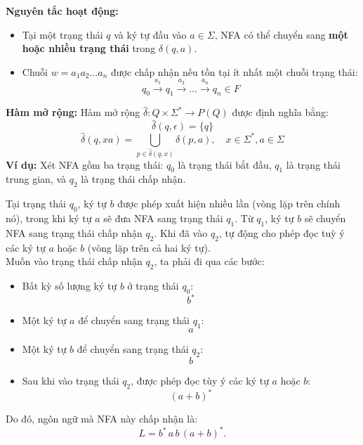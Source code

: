 \documentclass[12pt,a4paper]{report}
\begin{document}
\textbf{Nguyên tắc hoạt động:}  
\begin{itemize}
    \item Tại một trạng thái $q$ và ký tự đầu vào $a \in \Sigma$, NFA có thể chuyển sang \textbf{một hoặc nhiều trạng thái} trong $\delta(q,a)$.
    \item Chuỗi $w = a_1 a_2 \dots a_n$ được chấp nhận nếu tồn tại ít nhất một chuỗi trạng thái:
    \[
        q_0 \xrightarrow{a_1} q_1 \xrightarrow{a_2} \dots \xrightarrow{a_n} q_n \in F
    \]
\end{itemize}

\textbf{Hàm mở rộng:}  
Hàm mở rộng $\hat{\delta}: Q \times \Sigma^* \rightarrow P(Q)$ được định nghĩa bằng:
\[
\hat{\delta}(q, \epsilon) = \{q\}
\]
\[
\hat{\delta}(q, xa) = \bigcup_{p \in \hat{\delta}(q, x)} \delta(p, a), \quad x \in \Sigma^*, a \in \Sigma
\]
\textbf{Ví dụ:}
Xét NFA gồm ba trạng thái: 
$q_0$ là trạng thái bắt đầu, $q_1$ là trạng thái trung gian, 
và $q_2$ là trạng thái chấp nhận. 

Tại trạng thái $q_0$, ký tự $b$ được phép xuất hiện nhiều lần 
(vòng lặp trên chính nó), trong khi ký tự $a$ sẽ đưa NFA sang 
trạng thái $q_1$. Từ $q_1$, ký tự $b$ sẽ chuyển NFA sang trạng thái 
chấp nhận $q_2$. Khi đã vào $q_2$, tự động cho phép đọc tuỳ ý 
các ký tự $a$ hoặc $b$ (vòng lặp trên cả hai ký tự).
\\
Muốn vào trạng thái chấp nhận $q_2$, ta phải đi qua các bước:

\begin{itemize}
    \item Bất kỳ số lượng ký tự $b$ ở trạng thái $q_0$:
    \[
        b^{*}
    \]
    \item Một ký tự $a$ để chuyển sang trạng thái $q_1$:
    \[
        a
    \]
    \item Một ký tự $b$ để chuyển sang trạng thái $q_2$:
    \[
        b
    \]
    \item Sau khi vào trạng thái $q_2$, được phép đọc tùy ý các ký tự $a$ hoặc $b$:
    \[
        (a + b)^{*}
    \]
\end{itemize}

Do đó, ngôn ngữ mà NFA này chấp nhận là:
\[
L = b^{*}\, a\, b\, (a+b)^{*}.
\]


\begin{center}
\end{center}
\end{document}
